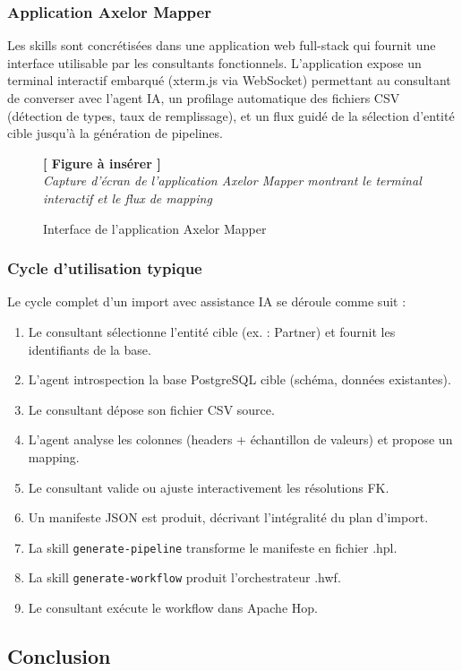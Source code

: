 \documentclass[a4paper,12pt]{article}
\newcommand{\insertfig}[3][0.80]{%
  \begin{figure}[H]
  \centering
  \colorbox{placeholderbg}{\parbox{#1\textwidth}{%
    \vspace{1.6cm}
    \centering
    {\large\color{placeholderborder}\textbf{[ Figure à insérer ]}}\\[0.5cm]
    {\small\color{gray}\textit{#2}}%
    \vspace{1.6cm}
  }}
  \caption{#3}
  \end{figure}
}
\begin{document}
\subsubsection{Application Axelor Mapper}

Les skills sont concrétisées dans une application web full-stack qui fournit une interface utilisable par les consultants fonctionnels. L'application expose un terminal interactif embarqué (xterm.js via WebSocket) permettant au consultant de converser avec l'agent IA, un profilage automatique des fichiers CSV (détection de types, taux de remplissage), et un flux guidé de la sélection d'entité cible jusqu'à la génération de pipelines.

\insertfig{Capture d'écran de l'application Axelor Mapper montrant le terminal interactif et le flux de mapping}{Interface de l'application Axelor Mapper}

\subsubsection{Cycle d'utilisation typique}

Le cycle complet d'un import avec assistance IA se déroule comme suit :

\begin{enumerate}
  \item Le consultant sélectionne l'entité cible (ex. : Partner) et fournit les identifiants de la base.
  \item L'agent introspection la base PostgreSQL cible (schéma, données existantes).
  \item Le consultant dépose son fichier CSV source.
  \item L'agent analyse les colonnes (headers + échantillon de valeurs) et propose un mapping.
  \item Le consultant valide ou ajuste interactivement les résolutions FK.
  \item Un manifeste JSON est produit, décrivant l'intégralité du plan d'import.
  \item La skill \texttt{generate-pipeline} transforme le manifeste en fichier .hpl.
  \item La skill \texttt{generate-workflow} produit l'orchestrateur .hwf.
  \item Le consultant exécute le workflow dans Apache Hop.
\end{enumerate}

\subsection{Conclusion}
\end{document}
